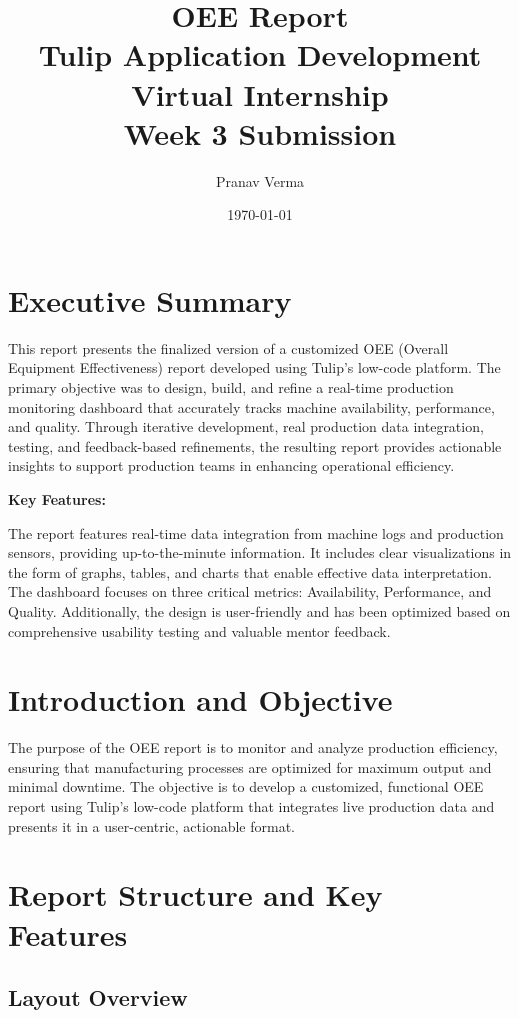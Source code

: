 \documentclass[a4paper,12pt]{article}
\title{OEE Report \\ \large Tulip Application Development Virtual Internship \\ Week 3 Submission}
\author{Pranav Verma}
\date{\today}
\begin{document}
\maketitle
\tableofcontents
\newpage

\section{Executive Summary}

This report presents the finalized version of a customized OEE (Overall Equipment Effectiveness) report developed using Tulip's low-code platform. The primary objective was to design, build, and refine a real-time production monitoring dashboard that accurately tracks machine availability, performance, and quality. Through iterative development, real production data integration, testing, and feedback-based refinements, the resulting report provides actionable insights to support production teams in enhancing operational efficiency.

\vspace{0.5cm}
\noindent\textbf{Key Features:}

The report features real-time data integration from machine logs and production sensors, providing up-to-the-minute information. It includes clear visualizations in the form of graphs, tables, and charts that enable effective data interpretation. The dashboard focuses on three critical metrics: Availability, Performance, and Quality. Additionally, the design is user-friendly and has been optimized based on comprehensive usability testing and valuable mentor feedback.

\section{Introduction and Objective}

The purpose of the OEE report is to monitor and analyze production efficiency, ensuring that manufacturing processes are optimized for maximum output and minimal downtime. The objective is to develop a customized, functional OEE report using Tulip's low-code platform that integrates live production data and presents it in a user-centric, actionable format.

\section{Report Structure and Key Features}

\subsection{Layout Overview}
\end{document}
